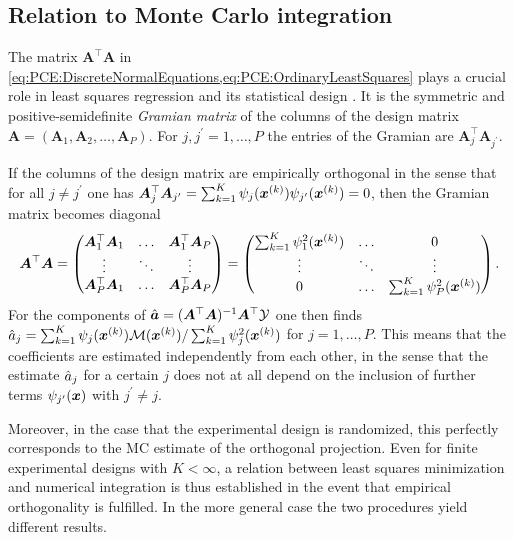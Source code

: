 \subsection{Relation to Monte Carlo integration}
The matrix \(\bm{A}^\top \bm{A}\) in \cref{eq:PCE:DiscreteNormalEquations,eq:PCE:OrdinaryLeastSquares}
plays a crucial role in least squares regression and its statistical design \cite{Statistics:Fedorov1997,Statistics:Pukelsheim2006}.
It is the symmetric and positive-semidefinite \emph{Gramian matrix} of the columns of the design matrix \(\bm{A} = (\bm{A}_1,\bm{A}_2,\ldots,\bm{A}_P)\).
For \(j,j^\prime = 1,\ldots,P\) the entries of the Gramian are \(\bm{A}_j^\top \bm{A}_{j^\prime}\).
\par %
If the columns of the design matrix are empirically orthogonal in the sense that for all \(j \neq j^\prime\) one has
\(\bm{A}_j^\top \bm{A}_{j^\prime} = \sum_{k=1}^K \psi_{j}(\bm{x}^{(k)}) \psi_{j^\prime}(\bm{x}^{(k)}) = 0\),
then the Gramian matrix becomes diagonal
\begin{equation} \label{eq:PCE:GramianMatrix}
  \bm{A}^\top \bm{A} = \begin{pmatrix}
                         \bm{A}_1^\top \bm{A}_1 & \ldots & \bm{A}_1^\top \bm{A}_P \\
                         \vdots & \ddots & \vdots \\
                         \bm{A}_P^\top \bm{A}_1 & \ldots & \bm{A}_P^\top \bm{A}_P \\
                       \end{pmatrix}
                     = \begin{pmatrix}
                         \sum_{k=1}^K \psi^2_{1}(\bm{x}^{(k)}) & \ldots & 0 \\
                         \vdots & \ddots & \vdots \\
                         0 & \ldots & \sum_{k=1}^K \psi^2_{P}(\bm{x}^{(k)}) \\
                       \end{pmatrix}.
\end{equation}
For the components of \(\hat{\bm{a}} = (\bm{A}^\top \bm{A})^{-1} \bm{A}^\top \mathcal{Y}\) one then finds
\(\hat{a}_j = \sum_{k=1}^K \psi_{j}(\bm{x}^{(k)}) \mathcal{M}(\bm{x}^{(k)}) / \sum_{k=1}^K \psi^2_{j}(\bm{x}^{(k)})\) for \(j = 1,\ldots,P\).
This means that the coefficients are estimated independently from each other, in the sense that the estimate \(\hat{a}_j\) for a certain \(j\)
does not at all depend on the inclusion of further terms \(\psi_{j^\prime}(\bm{x})\) with \(j^\prime \neq j\).
\par %
Moreover, in the case that the experimental design is randomized, this perfectly corresponds to the MC estimate of the orthogonal projection.
Even for finite experimental designs with \(K < \infty\), a relation between least squares minimization
and numerical integration is thus established in the event that empirical orthogonality is fulfilled.
In the more general case the two procedures yield different results.